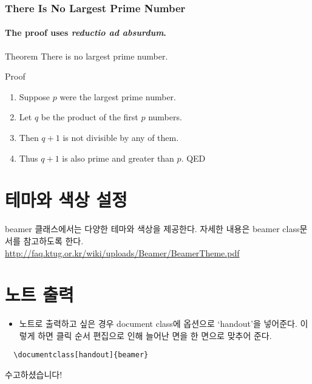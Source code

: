 \documentclass[hyperref={unicode}]{beamer}
\begin{document}
 \begin{frame} 
    \frametitle{There Is No Largest Prime Number} 
    \framesubtitle{The proof uses \textit{reductio ad absurdum}.} 
    \begin{block}{Theorem} 
      There is no largest prime number. 
    \end{block} 
    \begin{block}{Proof} 
      \begin{enumerate} 
        \item<1-> Suppose $p$ were the largest prime number. 
        \item<2-> Let $q$ be the product of the first $p$ numbers. 
        \item<3-> Then $q + 1$ is not divisible by any of them. 
        \item<1-> Thus $q + 1$ is also prime and greater than $p$. QED
      \end{enumerate} 
    \end{block} 
  \end{frame}


\section{테마와 색상 설정}
\begin{frame}
\begin{block}{}
beamer 클래스에서는 다양한 테마와 색상을 제공한다. 자세한 내용은 beamer class문서를 참고하도록 한다. 
\url{http://faq.ktug.or.kr/wiki/uploads/Beamer/BeamerTheme.pdf}
\end{block}
\end{frame}

\section{노트 출력}
\begin{frame}[fragile]
\begin{itemize}
\item [] 노트로 출력하고 싶은 경우 document class에 옵션으로 `handout'을 넣어준다. 이렇게 하면 클릭 순서 편집으로 인해 늘어난 면을 한 면으로 맞추어 준다. 
\end{itemize}

\begin{block}{}
\begin{verbatim}
  \documentclass[handout]{beamer}
\end{verbatim}
\end{block}

\end{frame}

\begin{frame}
\begin{block}{}
\begin{center}
\Huge
수고하셨습니다!
\end{center}
\end{block}
\end{frame}
\end{document}
